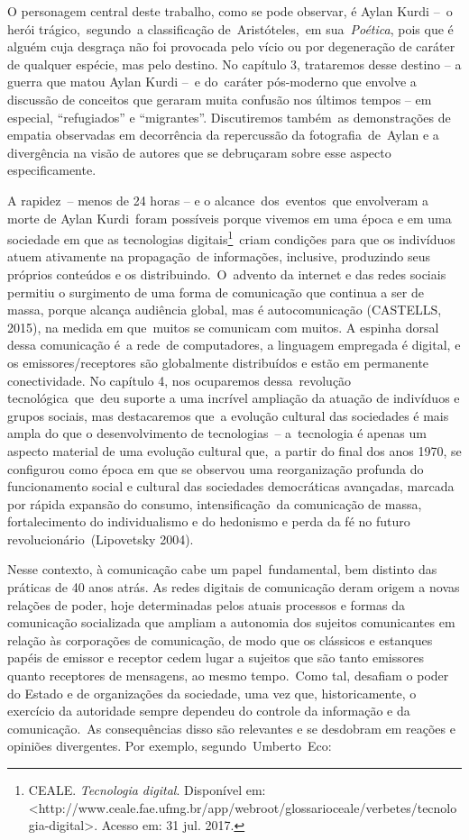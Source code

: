 \documentclass[
  letterpaper,
]{abntex2}
\begin{document}
O personagem central deste trabalho, como se pode observar, é Aylan
Kurdi --~o herói trágico,~segundo~a classificação de~Aristóteles,~em
sua~\emph{Poética}, pois que é alguém cuja desgraça não foi provocada
pelo vício ou por degeneração de caráter de qualquer espécie, mas pelo
destino. No capítulo 3, trataremos desse destino -- a guerra que matou
Aylan Kurdi --~e do~caráter pós-moderno que envolve a discussão de
conceitos que geraram muita confusão nos últimos tempos -- em especial,
``refugiados'' e ``migrantes''. Discutiremos também~as demonstrações de
empatia observadas em decorrência da repercussão da fotografia~de~Aylan
e a divergência na visão de autores que se debruçaram sobre esse aspecto
especificamente.~

A rapidez~-- menos de 24 horas -- e o alcance~dos~eventos~que envolveram
a morte de Aylan Kurdi~foram possíveis porque vivemos em uma época e em
uma sociedade em que as tecnologias digitais\footnote{CEALE.
  \emph{Tecnologia digital}. Disponível em:
  \textless http://www.ceale.fae.ufmg.br/app/webroot/glossarioceale/verbetes/tecnologia-digital\textgreater.
  Acesso em: 31 jul. 2017.}~criam condições para que os indivíduos atuem
ativamente na propagação~de informações, inclusive, produzindo seus
próprios conteúdos e os distribuindo.~O~advento da internet e das redes
sociais permitiu o surgimento de uma forma de comunicação que continua a
ser de massa, porque alcança audiência global, mas é autocomunicação
(CASTELLS, 2015), na medida em que~muitos se comunicam com muitos. A
espinha dorsal dessa comunicação é~a rede~de computadores, a linguagem
empregada é digital, e os emissores/receptores são globalmente
distribuídos e estão em permanente conectividade. No capítulo 4, nos
ocuparemos dessa~revolução tecnológica~que~deu suporte a uma incrível
ampliação da atuação de indivíduos e grupos sociais, mas destacaremos
que~a evolução cultural das sociedades é mais ampla do que o
desenvolvimento de tecnologias~-- a~tecnologia é apenas um aspecto
material de uma evolução cultural que,~a partir do final dos anos 1970,
se configurou como época em que se observou uma reorganização profunda
do funcionamento social e cultural das sociedades democráticas
avançadas, marcada por rápida expansão do consumo, intensificação~da
comunicação de massa, fortalecimento do individualismo e do hedonismo e
perda da fé no futuro revolucionário~(Lipovetsky 2004).~

Nesse contexto, à comunicação cabe um papel~fundamental, bem distinto
das práticas de 40 anos atrás. As redes digitais de comunicação deram
origem a novas relações de poder, hoje determinadas pelos atuais
processos e formas da comunicação socializada que ampliam a autonomia
dos sujeitos comunicantes em relação às corporações de comunicação, de
modo que os clássicos e estanques papéis de emissor e receptor cedem
lugar a sujeitos que são tanto emissores quanto receptores de mensagens,
ao mesmo tempo.~Como tal, desafiam o poder do Estado e de organizações
da sociedade, uma vez que, historicamente, o exercício da autoridade
sempre dependeu do controle da informação e da comunicação.~As
consequências disso são relevantes e se desdobram em reações e opiniões
divergentes. Por exemplo, segundo~Umberto~Eco:~
\end{document}
